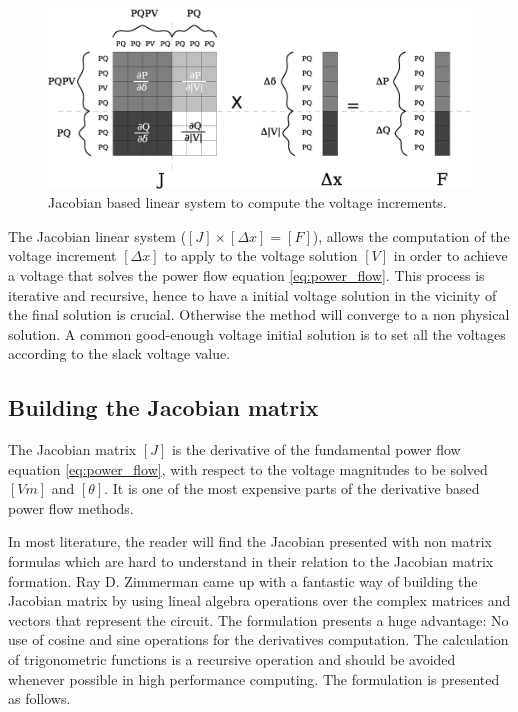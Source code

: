 \documentclass[nols,a4paper,twoside,notoc,fleqn]{tufte-book}
\begin{document}
\begin{center}
\begin{figure}[h!]
  \includegraphics[width=0.9\linewidth]{img/JacobianBased.eps}
  \caption{Jacobian based linear system to compute the voltage increments.}
  \label{fig:jacobian_based}
\end{figure}
\end{center}

The Jacobian linear system ($[J] \times [\Delta x] = [F]$), allows the computation of the voltage increment $[\Delta x]$ to apply to the voltage solution $[V]$ in order to achieve a voltage that solves the power flow equation \ref{eq:power_flow}. This process is iterative and recursive, hence to have a initial voltage solution in the vicinity of the final solution is crucial. Otherwise the method will converge to a non physical solution. A common good-enough voltage initial solution is to set all the voltages according to the slack voltage value.


\subsection{Building the Jacobian matrix} \label{Jacobian_chapter}

The Jacobian matrix $[J]$ is the derivative of the fundamental power flow equation \ref{eq:power_flow}, with respect to the voltage magnitudes to be solved $[Vm]$ and $[\theta]$. It is one of the most expensive parts of the derivative based power flow methods.

In most literature, the reader will find the Jacobian presented with non matrix formulas which are hard to understand in their relation to the Jacobian matrix formation. Ray D. Zimmerman came up with a fantastic way of building the Jacobian matrix \cite{zimmerman2010ac} by using lineal algebra operations over the complex matrices and vectors that represent the circuit. The formulation presents a huge advantage: No use of cosine and sine operations for the derivatives computation. The calculation of trigonometric functions is a recursive operation and should be avoided whenever possible in high performance computing. The formulation is presented as follows.
\end{document}
